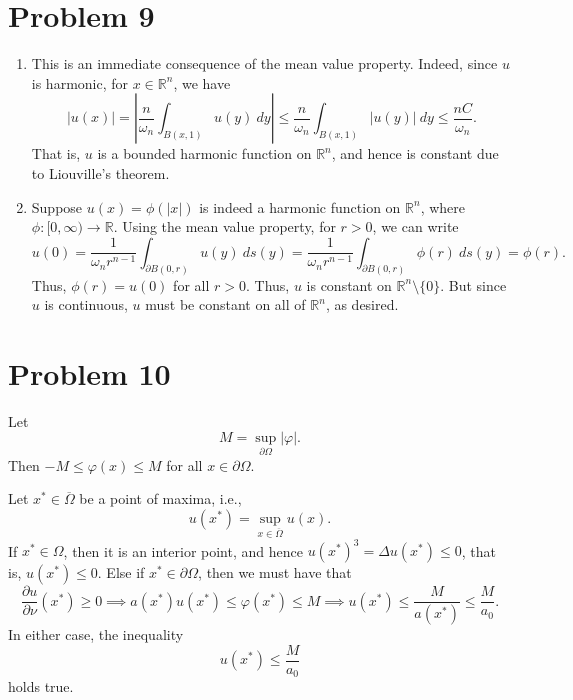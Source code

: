 \documentclass[10pt]{amsart}
\theoremstyle{thmstyle}
\theoremstyle{defstyle}
\newcommand{\R}{\mathbb{R}}
\renewcommand{\le}{\leqslant}
\renewcommand{\ge}{\geqslant}
\begin{document}
\section{Problem 9}

\begin{enumerate}[label=(\alph*)]
\item This is an immediate consequence of the mean value property. Indeed, since $u$ is harmonic, for $x\in\R^n$, we have 
\begin{equation*}
    |u(x)| = \left|\frac{n}{\omega_n}\int_{B(x, 1)}u(y)~dy\right|\le\frac{n}{\omega_n}\int_{B(x, 1)} |u(y)|~dy\le \frac{nC}{\omega_n}.
\end{equation*}
That is, $u$ is a bounded harmonic function on $\R^n$, and hence is constant due to Liouville's theorem. 

\item Suppose $u(x) = \phi(|x|)$ is indeed a harmonic function on $\R^n$, where $\phi: [0,\infty)\to\R$. Using the mean value property, for $r > 0$, we can write 
\begin{equation*}
    u(0) = \frac{1}{\omega_n r^{n - 1}}\int_{\partial B(0, r)}u(y)~ds(y) = \frac{1}{\omega_n r^{n - 1}}\int_{\partial B(0, r)}\phi(r)~ds(y) = \phi(r).
\end{equation*}
Thus, $\phi(r) = u(0)$ for all $r > 0$. Thus, $u$ is constant on $\R^n\setminus\{0\}$. But since $u$ is continuous, $u$ must be constant on all of $\R^n$, as desired.
\end{enumerate}

\section{Problem 10}

Let 
\begin{equation*}
    M = \sup_{\partial\Omega} |\varphi|.
\end{equation*}
Then $-M\le\varphi(x)\le M$ for all $x\in\partial\Omega$.

Let $x^\ast\in\overline\Omega$ be a point of maxima, i.e., 
\begin{equation*}
    u(x^\ast) = \sup_{x\in\overline\Omega} u(x).
\end{equation*} 
If $x^\ast\in\Omega$, then it is an interior point, and hence $u(x^\ast)^3 = \Delta u(x^\ast)\le 0$, that is, $u(x^\ast)\le 0$. Else if $x^\ast\in\partial\Omega$, then we must have that 
\begin{equation*}
    \frac{\partial u}{\partial\nu}(x^\ast)\ge 0\implies a(x^\ast)u(x^\ast)\le\varphi(x^\ast)\le M\implies u(x^\ast)\le\frac{M}{a(x^\ast)}\le\frac{M}{a_0}.
\end{equation*}
In either case, the inequality
\begin{equation*}
    u(x^\ast)\le\frac{M}{a_0}
\end{equation*}
holds true.
\end{document}
